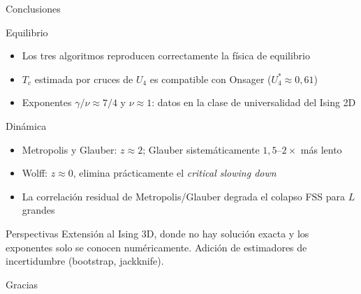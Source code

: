 \documentclass[10pt, aspectratio=169]{beamer}
\begin{document}
\begin{frame}{Conclusiones}
  \begin{block}{Equilibrio}
    \begin{itemize}
      \item Los tres algoritmos reproducen correctamente la física de equilibrio
      \item $T_c$ estimada por cruces de $U_4$ es compatible con Onsager ($U_4^*\approx 0{,}61$)
      \item Exponentes $\gamma/\nu \approx 7/4$ y $\nu\approx 1$: datos en la clase de universalidad del Ising 2D
    \end{itemize}
  \end{block}

  \begin{block}{Dinámica}
    \begin{itemize}
      \item Metropolis y Glauber: $z\approx 2$; Glauber sistemáticamente $1{,}5$–$2\times$ más lento
      \item Wolff: $z\approx 0$, elimina prácticamente el \emph{critical slowing down}
      \item La correlación residual de Metropolis/Glauber degrada el colapso FSS para $L$ grandes
    \end{itemize}
  \end{block}

  \begin{block}{Perspectivas}
    Extensión al Ising 3D, donde no hay solución exacta y los exponentes solo se conocen numéricamente. Adición de estimadores de incertidumbre (bootstrap, jackknife).
  \end{block}
\end{frame}

\begin{frame}[standout]
  \Huge Gracias
\end{frame}
\end{document}
